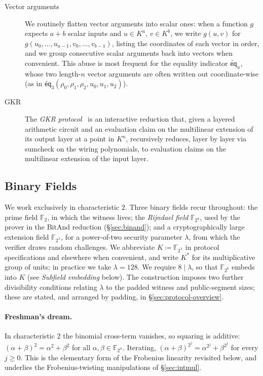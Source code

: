 \documentclass{article}
\theoremstyle{definition}
\newcommand*{\mle}{\widetilde}
\newcommand{\eq}{\mathsf{eq}}
\newcommand{\FF}[1]{\mathbb{F}_{#1}}
\begin{document}
\begin{description}
\item[Vector arguments] We routinely flatten vector arguments into scalar ones: when a function $g$ expects $a + b$ scalar inputs and $u \in K^a$, $v \in K^b$, we write $g(u, v)$ for $g(u_0, \ldots, u_{a - 1}, v_0, \ldots, v_{b - 1})$, listing the coordinates of each vector in order, and we group consecutive scalar arguments back into vectors when convenient. This abuse is most frequent for the equality indicator $\mle{\eq}_n$, whose two length-$n$ vector arguments are often written out coordinate-wise (as in $\mle{\eq}_3(\rho_0, \rho_1, \rho_2, u_0, u_1, u_2)$).

\item[GKR] The \emph{GKR protocol}~\cite{Goldwasser:2015aa} is an interactive reduction that, given a layered arithmetic circuit and an evaluation claim on the multilinear extension of its output layer at a point in $K^n$, recursively reduces, layer by layer via sumcheck on the wiring polynomials, to evaluation claims on the multilinear extension of the input layer.
\end{description}

\subsection{Binary Fields}
\label{sec:binary-fields}

We work exclusively in characteristic $2$. Three binary fields recur throughout: the prime field $\FF{2}$, in which the witness lives; the \emph{Rijndael field} $\FF{2^8}$, used by the prover in the BitAnd reduction (\S\ref{sec:binand}); and a cryptographically large extension field $\FF{2^\lambda}$, for a power-of-two security parameter $\lambda$, from which the verifier draws random challenges. We abbreviate $K \coloneqq \FF{2^\lambda}$ in protocol specifications and elsewhere when convenient, and write $K^*$ for its multiplicative group of units; in practice we take $\lambda = 128$. We require $8 \mid \lambda$, so that $\FF{2^8}$ embeds into $K$ (see \emph{Subfield embedding} below). The construction imposes two further divisibility conditions relating $\lambda$ to the padded witness and public-segment sizes; these are stated, and arranged by padding, in \S\ref{sec:protocol-overview}.

\paragraph{Freshman's dream.}
In characteristic $2$ the binomial cross-term vanishes, so squaring is additive: $(\alpha + \beta)^2 = \alpha^2 + \beta^2$ for all $\alpha, \beta \in \FF{2^n}$. Iterating, $(\alpha + \beta)^{2^j} = \alpha^{2^j} + \beta^{2^j}$ for every $j \geq 0$. This is the elementary form of the Frobenius linearity revisited below, and underlies the Frobenius-twisting manipulations of \S\ref{sec:intmul}.
\end{document}
